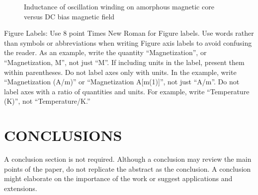 \documentclass[letterpaper, 10 pt, conference]{ieeeconf}  %
\begin{document}
   \begin{figure}[thpb]
      \centering
      \caption{Inductance of oscillation winding on amorphous
       magnetic core versus DC bias magnetic field}
      \label{figurelabel}
   \end{figure}
   

Figure Labels: Use 8 point Times New Roman for Figure labels. Use words rather than symbols or abbreviations when writing Figure axis labels to avoid confusing the reader. As an example, write the quantity ``Magnetization'', or ``Magnetization, M'', not just ``M''. If including units in the label, present them within parentheses. Do not label axes only with units. In the example, write ``Magnetization (A/m)'' or ``Magnetization {A[m(1)]}'', not just ``A/m''. Do not label axes with a ratio of quantities and units. For example, write ``Temperature (K)'', not ``Temperature/K.''

\section{CONCLUSIONS}

A conclusion section is not required. Although a conclusion may review the main points of the paper, do not replicate the abstract as the conclusion. A conclusion might elaborate on the importance of the work or suggest applications and extensions. 

\addtolength{\textheight}{-12cm}   %




\end{document}
